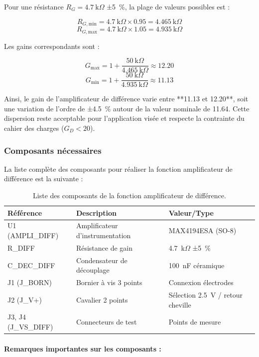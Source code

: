 \documentclass{article}
\begin{document}
Pour une résistance $R_G = 4.7~\text{k}\Omega$ ±5~\%, la plage de valeurs possibles est :

\[
R_{G,\text{min}} = 4.7~\text{k}\Omega \times 0.95 = 4.465~\text{k}\Omega
\]
\[
R_{G,\text{max}} = 4.7~\text{k}\Omega \times 1.05 = 4.935~\text{k}\Omega
\]

Les gains correspondants sont :

\[
G_{\text{max}} = 1 + \frac{50~\text{k}\Omega}{4.465~\text{k}\Omega} \approx 12.20
\]
\[
G_{\text{min}} = 1 + \frac{50~\text{k}\Omega}{4.935~\text{k}\Omega} \approx 11.13
\]

Ainsi, le gain de l'amplificateur de différence varie entre **11.13 et 12.20**, soit une variation de l'ordre de ±4.5~\% autour de la valeur nominale de 11.64. Cette dispersion reste acceptable pour l'application visée et respecte la contrainte du cahier des charges ($G_D < 20$).

\subsubsection{Composants nécessaires}

La liste complète des composants pour réaliser la fonction amplificateur de différence est la suivante :

\begin{table}[h!]
\centering
\begin{tabularx}{\textwidth}{|l|X|l|}
\hline
\textbf{Référence} & \textbf{Description} & \textbf{Valeur/Type} \\
\hline
U1 (AMPLI\_DIFF) & Amplificateur d'instrumentation & MAX4194ESA (SO-8) \\
\hline
R\_DIFF & Résistance de gain & 4.7~k$\Omega$ ±5~\% \\
\hline
C\_DEC\_DIFF & Condensateur de découplage & 100~nF céramique \\
\hline
J1 (J\_BORN) & Bornier à vis 3 points & Connexion électrodes \\
\hline
J2 (J\_V+) & Cavalier 2 points & Sélection 2.5~V / retour cheville \\
\hline
J3, J4 (J\_VS\_DIFF) & Connecteurs de test & Points de mesure \\
\hline
\end{tabularx}
\caption{Liste des composants de la fonction amplificateur de différence.}
\end{table}

\paragraph{Remarques importantes sur les composants :}
\end{document}
